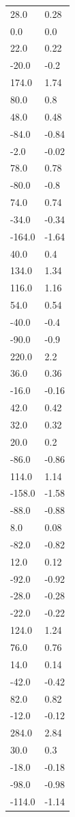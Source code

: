\begin{longtable}{ll}
28.0 & 0.28 \\
0.0 & 0.0 \\
22.0 & 0.22 \\
-20.0 & -0.2 \\
174.0 & 1.74 \\
80.0 & 0.8 \\
48.0 & 0.48 \\
-84.0 & -0.84 \\
-2.0 & -0.02 \\
78.0 & 0.78 \\
-80.0 & -0.8 \\
74.0 & 0.74 \\
-34.0 & -0.34 \\
-164.0 & -1.64 \\
40.0 & 0.4 \\
134.0 & 1.34 \\
116.0 & 1.16 \\
54.0 & 0.54 \\
-40.0 & -0.4 \\
-90.0 & -0.9 \\
220.0 & 2.2 \\
36.0 & 0.36 \\
-16.0 & -0.16 \\
42.0 & 0.42 \\
32.0 & 0.32 \\
20.0 & 0.2 \\
-86.0 & -0.86 \\
114.0 & 1.14 \\
-158.0 & -1.58 \\
-88.0 & -0.88 \\
8.0 & 0.08 \\
-82.0 & -0.82 \\
12.0 & 0.12 \\
-92.0 & -0.92 \\
-28.0 & -0.28 \\
-22.0 & -0.22 \\
124.0 & 1.24 \\
76.0 & 0.76 \\
14.0 & 0.14 \\
-42.0 & -0.42 \\
82.0 & 0.82 \\
-12.0 & -0.12 \\
284.0 & 2.84 \\
30.0 & 0.3 \\
-18.0 & -0.18 \\
-98.0 & -0.98 \\
-114.0 & -1.14 \\

\end{longtable}

